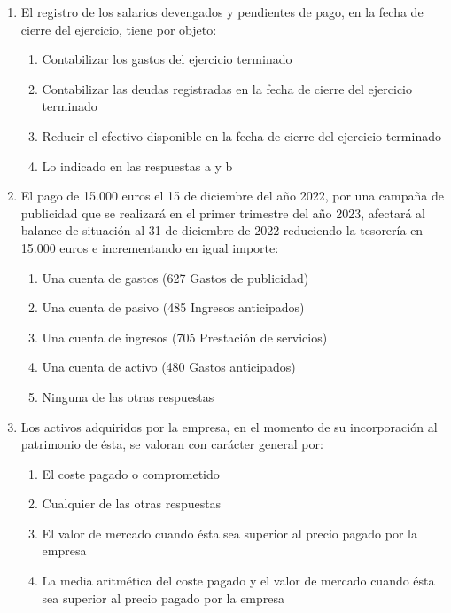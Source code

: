 \begin{enumerate}
\begin{enumerate}
        \item El beneficio aumenta
    \end{enumerate}
    \item El registro de los salarios devengados y pendientes de pago, en la fecha de cierre del ejercicio, tiene por objeto:
    \begin{enumerate}
        \item Contabilizar los gastos del ejercicio terminado
        \item Contabilizar las deudas registradas en la fecha de cierre del ejercicio terminado
        \item Reducir el efectivo disponible en la fecha de cierre del ejercicio terminado
        \item Lo indicado en las respuestas a y b
    \end{enumerate}
    \item El pago de 15.000 euros el 15 de diciembre del año 2022, por una campaña de publicidad que se realizará en el primer trimestre del año 2023, afectará al balance de situación al 31 de diciembre de 2022 reduciendo la tesorería en 15.000 euros e incrementando en igual importe:
    \begin{enumerate}
        \item Una cuenta de gastos (627 Gastos de publicidad)
        \item Una cuenta de pasivo (485 Ingresos anticipados)
        \item Una cuenta de ingresos (705 Prestación de servicios)
        \item Una cuenta de activo (480 Gastos anticipados)
        \item Ninguna de las otras respuestas
    \end{enumerate}
    \item Los activos adquiridos por la empresa, en el momento de su incorporación al patrimonio de ésta, se valoran con carácter general por:
    \begin{enumerate}
        \item El coste pagado o comprometido
        \item Cualquier de las otras respuestas
        \item El valor de mercado cuando ésta sea superior al precio pagado por la empresa
        \item La media aritmética del coste pagado y el valor de mercado cuando ésta sea superior al precio pagado por la empresa
    \end{enumerate}
\end{enumerate}